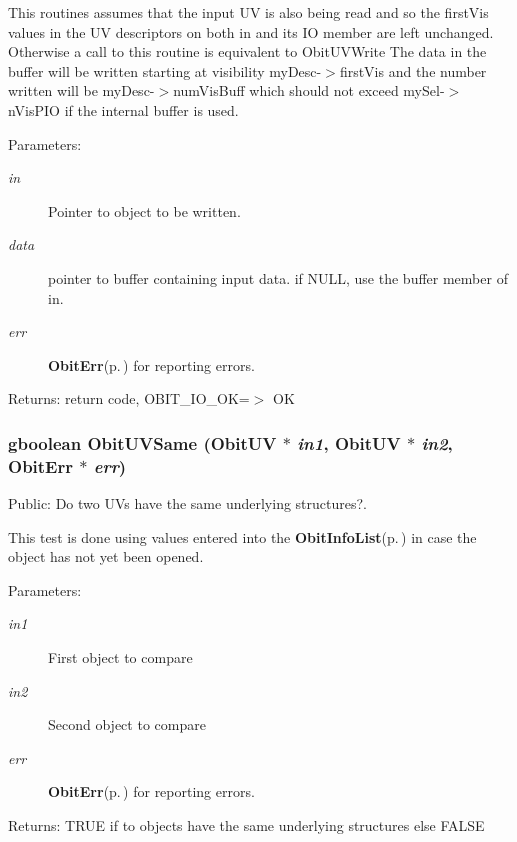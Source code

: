 This routines assumes that the input UV is also being read and so the first\-Vis values in the UV descriptors on both in and its IO member are left unchanged. Otherwise a call to this routine is equivalent to Obit\-UVWrite The data in the buffer will be written starting at visibility my\-Desc-$>$first\-Vis and the number written will be my\-Desc-$>$num\-Vis\-Buff which should not exceed my\-Sel-$>$n\-Vis\-PIO if the internal buffer is used. \begin{Desc}
\item[Parameters:]
\begin{description}
\item[{\em in}]Pointer to object to be written. \item[{\em data}]pointer to buffer containing input data. if NULL, use the buffer member of in. \item[{\em err}]{\bf Obit\-Err}{\rm (p.\,\pageref{structObitErr})} for reporting errors. \end{description}
\end{Desc}
\begin{Desc}
\item[Returns:]return code, OBIT\_\-IO\_\-OK=$>$ OK \end{Desc}
\subsubsection{\setlength{\rightskip}{0pt plus 5cm}gboolean Obit\-UVSame ({\bf Obit\-UV} $\ast$ {\em in1}, {\bf Obit\-UV} $\ast$ {\em in2}, {\bf Obit\-Err} $\ast$ {\em err})}\label{ObitUV_8c_a14}


Public: Do two UVs have the same underlying structures?. 

This test is done using values entered into the {\bf Obit\-Info\-List}{\rm (p.\,\pageref{structObitInfoList})} in case the object has not yet been opened. \begin{Desc}
\item[Parameters:]
\begin{description}
\item[{\em in1}]First object to compare \item[{\em in2}]Second object to compare \item[{\em err}]{\bf Obit\-Err}{\rm (p.\,\pageref{structObitErr})} for reporting errors. \end{description}
\end{Desc}
\begin{Desc}
\item[Returns:]TRUE if to objects have the same underlying structures else FALSE \end{Desc}

